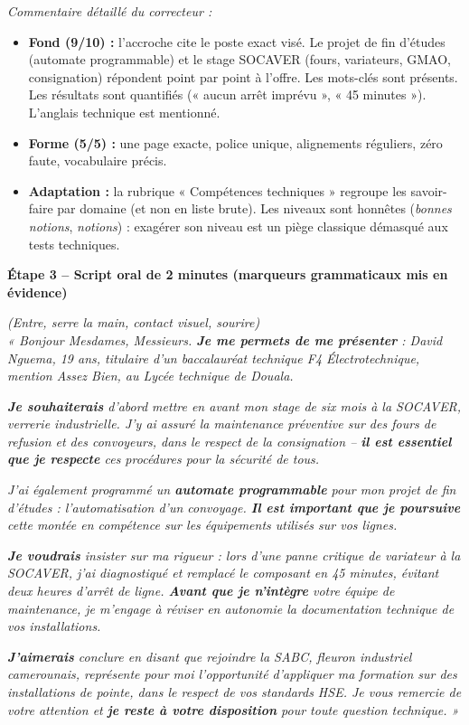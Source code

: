\documentclass[11pt]{article}
\begin{document}
\emph{Commentaire détaillé du correcteur :}
\begin{itemize}
    \item \textbf{Fond (9/10) :} l'accroche cite le poste exact visé. Le projet de fin d'études (automate programmable) et le stage SOCAVER (fours, variateurs, GMAO, consignation) répondent point par point à l'offre. Les mots-clés sont présents. Les résultats sont quantifiés (« aucun arrêt imprévu », « 45 minutes »). L'anglais technique est mentionné.
    \item \textbf{Forme (5/5) :} une page exacte, police unique, alignements réguliers, zéro faute, vocabulaire précis.
    \item \textbf{Adaptation :} la rubrique « Compétences techniques » regroupe les savoir-faire par domaine (et non en liste brute). Les niveaux sont honnêtes (\emph{bonnes notions}, \emph{notions}) : exagérer son niveau est un piège classique démasqué aux tests techniques.
\end{itemize}

\textbf{Étape 3 -- Script oral de 2 minutes (marqueurs grammaticaux mis en évidence)}

\begin{exemplebox}
\textit{(Entre, serre la main, contact visuel, sourire)} \\
\emph{« Bonjour Mesdames, Messieurs. \textbf{Je me permets de me présenter} : David Nguema, 19 ans, titulaire d'un baccalauréat technique F4 Électrotechnique, mention Assez Bien, au Lycée technique de Douala.}

\emph{\textbf{Je souhaiterais} d'abord mettre en avant mon stage de six mois à la SOCAVER, verrerie industrielle. J'y ai assuré la maintenance préventive sur des fours de refusion et des convoyeurs, dans le respect de la consignation -- \textbf{il est essentiel que je respecte} ces procédures pour la sécurité de tous.}

\emph{J'ai également programmé un \textbf{automate programmable} pour mon projet de fin d'études : l'automatisation d'un convoyage. \textbf{Il est important que je poursuive} cette montée en compétence sur les équipements utilisés sur vos lignes.}

\emph{\textbf{Je voudrais} insister sur ma rigueur : lors d'une panne critique de variateur à la SOCAVER, j'ai diagnostiqué et remplacé le composant en 45 minutes, évitant deux heures d'arrêt de ligne. \textbf{Avant que je n'intègre} votre équipe de maintenance, je m'engage à réviser en autonomie la documentation technique de vos installations.}

\emph{\textbf{J'aimerais} conclure en disant que rejoindre la SABC, fleuron industriel camerounais, représente pour moi l'opportunité d'appliquer ma formation sur des installations de pointe, dans le respect de vos standards HSE. Je vous remercie de votre attention et \textbf{je reste à votre disposition} pour toute question technique. »}
\end{exemplebox}
\end{document}
